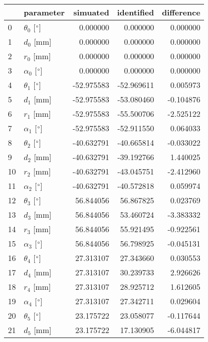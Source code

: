 \documentclass{standalone}%
\begin{document}
%
\normalsize%
\begin{tabular}{llrrr}
\toprule
{} &                 parameter &   simuated & identified & difference \\
\midrule
0  &  $\theta_{0}$ [$\degree$] &   0.000000 &   0.000000 &   0.000000 \\
1  &              $d_{0}$ [mm] &   0.000000 &   0.000000 &   0.000000 \\
2  &              $r_{0}$ [mm] &   0.000000 &   0.000000 &   0.000000 \\
3  &  $\alpha_{0}$ [$\degree$] &   0.000000 &   0.000000 &   0.000000 \\
4  &  $\theta_{1}$ [$\degree$] & -52.975583 & -52.969611 &   0.005973 \\
5  &              $d_{1}$ [mm] & -52.975583 & -53.080460 &  -0.104876 \\
6  &              $r_{1}$ [mm] & -52.975583 & -55.500706 &  -2.525122 \\
7  &  $\alpha_{1}$ [$\degree$] & -52.975583 & -52.911550 &   0.064033 \\
8  &  $\theta_{2}$ [$\degree$] & -40.632791 & -40.665814 &  -0.033022 \\
9  &              $d_{2}$ [mm] & -40.632791 & -39.192766 &   1.440025 \\
10 &              $r_{2}$ [mm] & -40.632791 & -43.045751 &  -2.412960 \\
11 &  $\alpha_{2}$ [$\degree$] & -40.632791 & -40.572818 &   0.059974 \\
12 &  $\theta_{3}$ [$\degree$] &  56.844056 &  56.867825 &   0.023769 \\
13 &              $d_{3}$ [mm] &  56.844056 &  53.460724 &  -3.383332 \\
14 &              $r_{3}$ [mm] &  56.844056 &  55.921495 &  -0.922561 \\
15 &  $\alpha_{3}$ [$\degree$] &  56.844056 &  56.798925 &  -0.045131 \\
16 &  $\theta_{4}$ [$\degree$] &  27.313107 &  27.343660 &   0.030553 \\
17 &              $d_{4}$ [mm] &  27.313107 &  30.239733 &   2.926626 \\
18 &              $r_{4}$ [mm] &  27.313107 &  28.925712 &   1.612605 \\
19 &  $\alpha_{4}$ [$\degree$] &  27.313107 &  27.342711 &   0.029604 \\
20 &  $\theta_{5}$ [$\degree$] &  23.175722 &  23.058077 &  -0.117644 \\
21 &              $d_{5}$ [mm] &  23.175722 &  17.130905 &  -6.044817 \\

\end{tabular}
\end{document}
